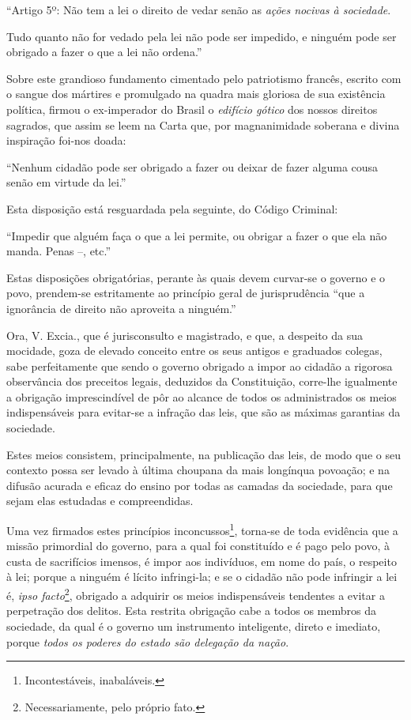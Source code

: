 ``Artigo 5º: Não tem a lei o direito de vedar senão as \emph{ações
nocivas à sociedade}.

Tudo quanto não for vedado pela lei não pode ser impedido, e ninguém
pode ser obrigado a fazer o que a lei não ordena.''

Sobre este grandioso fundamento cimentado pelo patriotismo francês,
escrito com o sangue dos mártires e promulgado na quadra mais gloriosa
de sua existência política, firmou o ex-imperador do Brasil o
\emph{edifício gótico} dos nossos direitos sagrados, que assim se leem
na Carta que, por magnanimidade soberana e divina inspiração foi-nos
doada:

``Nenhum cidadão pode ser obrigado a fazer ou deixar de fazer alguma
cousa senão em virtude da lei.''

Esta disposição está resguardada pela seguinte, do Código Criminal:

``Impedir que alguém faça o que a lei permite, ou obrigar a fazer o que
ela não manda. Penas --, etc.''

Estas disposições obrigatórias, perante às quais devem curvar-se o
governo e o povo, prendem-se estritamente ao princípio geral de
jurisprudência ``que a ignorância de direito não aproveita a ninguém.''

Ora, V. Excia., que é jurisconsulto e magistrado, e que, a despeito da
sua mocidade, goza de elevado conceito entre os seus antigos e graduados
colegas, sabe perfeitamente que sendo o governo obrigado a impor ao
cidadão a rigorosa observância dos preceitos legais, deduzidos da
Constituição, corre-lhe igualmente a obrigação imprescindível de pôr ao
alcance de todos os administrados os meios indispensáveis para evitar-se
a infração das leis, que são as máximas garantias da sociedade.

Estes meios consistem, principalmente, na publicação das leis, de modo
que o seu contexto possa ser levado à última choupana da mais longínqua
povoação; e na difusão acurada e eficaz do ensino por todas as camadas
da sociedade, para que sejam elas estudadas e compreendidas.

Uma vez firmados estes princípios inconcussos\footnote{Incontestáveis,
  inabaláveis.}, torna-se de toda evidência que a missão primordial do
governo, para a qual foi constituído e é pago pelo povo, à custa de
sacrifícios imensos, é impor aos indivíduos, em nome do país, o respeito
à lei; porque a ninguém é lícito infringi-la; e se o cidadão não pode
infringir a lei é, \emph{ipso facto}\footnote{Necessariamente, pelo
  próprio fato.}, obrigado a adquirir os meios indispensáveis tendentes
a evitar a perpetração dos delitos. Esta restrita obrigação cabe a todos
os membros da sociedade, da qual é o governo um instrumento inteligente,
direto e imediato, porque \emph{todos os poderes do estado são delegação
da nação}.

